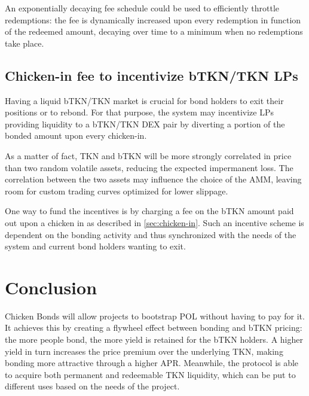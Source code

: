 \documentclass{article}
\begin{document}
An exponentially decaying fee schedule could be used to efficiently throttle redemptions: the fee is dynamically increased upon every redemption in function of the redeemed amount, decaying over time to a minimum when no redemptions take place.

\subsection{Chicken-in fee to incentivize bTKN/TKN LPs}
  \label{sec:chicken-in-fee}
Having a liquid bTKN/TKN market is crucial for bond holders to exit their positions or to rebond.
For that purpose, the system may incentivize LPs providing liquidity to a bTKN/TKN DEX pair by diverting a portion of the bonded amount upon every chicken-in. 

As a matter of fact, TKN and bTKN will be more strongly correlated in price than two random volatile assets, reducing the expected impermanent loss. The correlation between the two assets may influence the choice of the AMM, leaving room for custom trading curves optimized for lower slippage.

One way to fund the incentives is by charging a fee on the bTKN amount paid out upon a chicken in as described in \ref{sec:chicken-in}. 
Such an incentive scheme is dependent on the bonding activity and thus synchronized with the needs of the system and current bond holders wanting to exit.

\section{Conclusion}
Chicken Bonds will allow projects to bootstrap POL without having to pay for it. It achieves this by creating a flywheel effect between bonding and bTKN pricing: the more people bond, the more yield is retained for the bTKN holders. A higher yield in turn increases the price premium over the underlying TKN, making bonding more attractive through a higher APR. Meanwhile, the protocol is able to acquire both permanent and redeemable TKN liquidity, which can be put to different uses based on the needs of the project.
\end{document}
